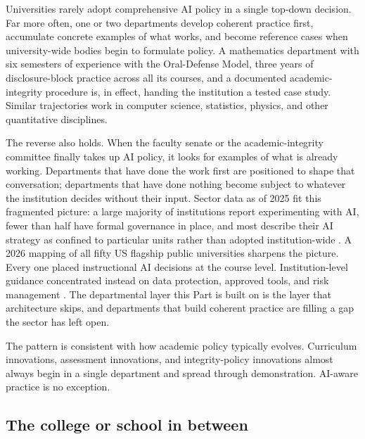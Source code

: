 \documentclass{SIAMbook2023}
\begin{document}
Universities rarely adopt comprehensive AI policy in a single top-down decision. Far more often, one or two departments develop coherent practice first, accumulate concrete examples of what works, and become reference cases when university-wide bodies begin to formulate policy. A mathematics department with six semesters of experience with the Oral-Defense Model, three years of disclosure-block practice across all its courses, and a documented academic-integrity procedure is, in effect, handing the institution a tested case study. Similar trajectories work in computer science, statistics, physics, and other quantitative disciplines.

The reverse also holds. When the faculty senate or the academic-integrity committee finally takes up AI policy, it looks for examples of what is already working. Departments that have done the work first are positioned to shape that conversation; departments that have done nothing become subject to whatever the institution decides without their input. Sector data as of 2025 fit this fragmented picture: a large majority of institutions report experimenting with AI, fewer than half have formal governance in place, and most describe their AI strategy as confined to particular units rather than adopted institution-wide \citep{educause2025landscape}. A 2026 mapping of all fifty US flagship public universities sharpens the picture. Every one placed instructional AI decisions at the course level. Institution-level guidance concentrated instead on data protection, approved tools, and risk management \citep{lafrance2026governing}. The departmental layer this Part is built on is the layer that architecture skips, and departments that build coherent practice are filling a gap the sector has left open.

The pattern is consistent with how academic policy typically evolves. Curriculum innovations, assessment innovations, and integrity-policy innovations almost always begin in a single department and spread through demonstration. AI-aware practice is no exception.

\subsection{The college or school in between}
\label{u:subsec:college-layer}%
%
\end{document}
